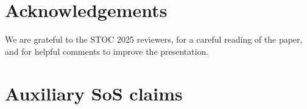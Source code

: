 \documentclass{article}
\begin{document}
\begin{abstract}
\medskip



%
\end{abstract}





\newpage
{}
\setcounter{page}{1}











%



\section*{Acknowledgements}
%
We are grateful to the STOC 2025 reviewers, for a careful reading of the paper, and
for helpful comments to improve the presentation.

%




\appendix
\section{Auxiliary SoS claims}\label{sec:appendix}

\end{document}
